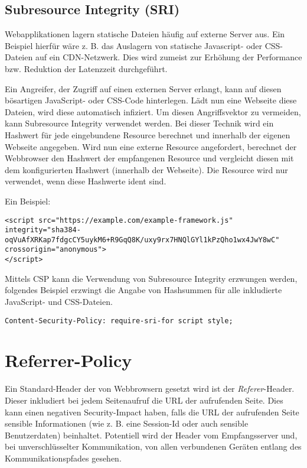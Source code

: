 \subsection{Subresource Integrity (SRI)}

Webapplikationen lagern statische Dateien häufig auf externe Server aus. Ein Beispiel hierfür wäre z. B. das Auslagern von statische Javascript- oder CSS-Dateien auf ein CDN-Netzwerk. Dies wird zumeist zur Erhöhung der Performance bzw. Reduktion der Latenzzeit durchgeführt.

Ein Angreifer, der Zugriff auf einen externen Server erlangt, kann auf diesen bösartigen JavaScript- oder CSS-Code hinterlegen. Lädt nun eine Webseite diese Dateien, wird diese automatisch infiziert. Um diesen Angriffsvektor zu vermeiden, kann Subresource Integrity verwendet werden. Bei dieser Technik wird ein Hashwert für jede eingebundene Resource berechnet und innerhalb der eigenen Webseite angegeben. Wird nun eine externe Resource angefordert, berechnet der Webbrowser den Hashwert der empfangenen Resource und vergleicht diesen mit dem konfigurierten Hashwert (innerhalb der Webseite). Die Resource wird nur verwendet, wenn diese Hashwerte ident sind.

Ein Beispiel:

\begin{verbatim}
<script src="https://example.com/example-framework.js"
integrity="sha384-oqVuAfXRKap7fdgcCY5uykM6+R9GqQ8K/uxy9rx7HNQlGYl1kPzQho1wx4JwY8wC"
crossorigin="anonymous">
</script>
\end{verbatim}

Mittels CSP kann die Verwendung von Subresource Integrity erzwungen werden, folgendes Beispiel erzwingt die Angabe von Hashsummen für alle inkludierte JavaScript- und CSS-Dateien.

\begin{verbatim}
Content-Security-Policy: require-sri-for script style;
\end{verbatim}


\section{Referrer-Policy}
\label{referrer_policy}

Ein Standard-Header der von Webbrowsern gesetzt wird ist der \textit{Referer}-Header. Dieser inkludiert bei jedem Seitenaufruf die URL der aufrufenden Seite. Dies kann einen negativen Security-Impact haben, falls die URL der aufrufenden Seite sensible Informationen (wie z. B. eine Session-Id oder auch sensible Benutzerdaten) beinhaltet. Potentiell wird der Header vom Empfangsserver und, bei unverschlüsselter Kommunikation, von allen verbundenen Geräten entlang des Kommunikationspfades gesehen.

